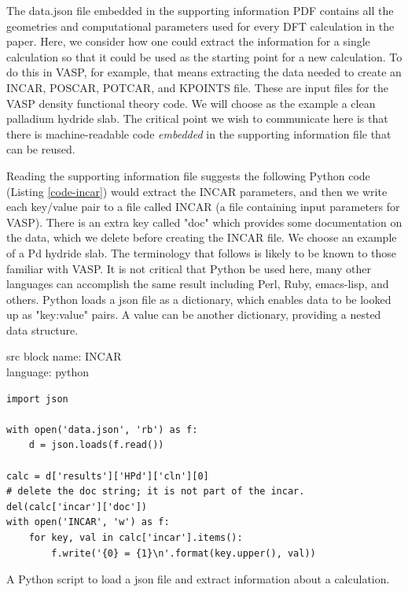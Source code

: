 \documentclass[journal=accacs,manuscript=article,email=true]{achemso}
\begin{document}
The data.json file embedded in the supporting information PDF contains all the geometries and computational parameters used for every DFT calculation in the paper. Here, we consider how one could extract the information for a single calculation so that it could be used as the starting point for a new calculation. To do this in VASP, for example, that means extracting the data needed to create an INCAR, POSCAR, POTCAR, and KPOINTS file. These are input files for the VASP density functional theory code. We will choose as the example a clean palladium hydride slab. The critical point we wish to communicate here is that there is machine-readable code \emph{embedded} in the supporting information file that can be reused.

Reading the supporting information file suggests the following Python \cite{python,millman-2011-python-scien-engin,perkel-2015-progr} code (Listing \ref{code-incar}) would extract the INCAR parameters, and then we write each key/value pair to a file called INCAR (a file containing input parameters for VASP). There is an extra key called "doc" which provides some documentation on the data, which we delete before creating the INCAR file. We choose an example of a Pd hydride slab. The terminology that follows is likely to be known to those familiar with VASP. It is not critical that Python be used here, many other languages can accomplish the same result including Perl, Ruby, emacs-lisp, and others. Python loads a json file as a dictionary, which enables data to be looked up as "key:value" pairs. A value can be another dictionary, providing a nested data structure.

\begin{tcolorbox}
src block name: INCAR\\language: python\begin{listing}[H]
\begin{verbatim}
import json

with open('data.json', 'rb') as f:
    d = json.loads(f.read())

calc = d['results']['HPd']['cln'][0]
# delete the doc string; it is not part of the incar.
del(calc['incar']['doc'])
with open('INCAR', 'w') as f:
    for key, val in calc['incar'].items():
        f.write('{0} = {1}\n'.format(key.upper(), val))
\end{verbatim}
\caption{\label{INCAR}A Python script to load a json file and extract information about a calculation. \label{code-incar}}
\end{listing}
\end{tcolorbox}
\end{document}
